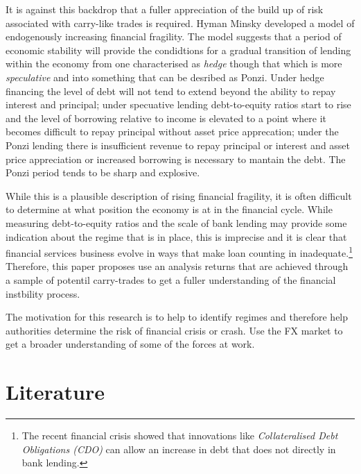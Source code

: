 \documentclass[12pt, a4paper, oneside]{article} %
\begin{document}
It is against this backdrop that a fuller appreciation of the build up of risk associated with carry-like trades is required. Hyman Minsky developed a model of endogenously increasing financial fragility.  The model suggests that a period of economic stability will provide the condidtions for a gradual transition of lending within the economy from one characterised as \emph{hedge} though that which is more \emph{speculative} and into something that can be desribed as {Ponzi}.  Under hedge financing the level of debt will not tend to extend beyond the ability to repay interest and principal; under specuative lending debt-to-equity ratios start to rise and the level of borrowing relative to income is elevated to a point where it becomes difficult to repay principal without asset price apprecation; under the Ponzi lending there is insufficient revenue to repay principal or interest and asset price appreciation or increased borrowing is necessary to mantain the debt. The Ponzi period tends to be sharp and explosive.

While this is a plausible description of rising financial fragility, it is often difficult to determine at what position the economy is at in the financial cycle.  While measuring debt-to-equity ratios and the scale of bank lending may provide some indication about the regime that is in place, this is imprecise and it is clear that financial services business evolve in ways that make loan counting in inadequate.\footnote{The recent financial crisis showed that innovations like \emph{Collateralised Debt Obligations (CDO)} can allow an increase in debt that does not directly in bank lending.}   Therefore, this paper proposes use an analysis returns that are achieved through a sample of potentil carry-trades to get a fuller understanding of the financial instbility process.  

The motivation for this research is to help to identify regimes and therefore help authorities determine the risk of financial crisis or crash. Use the FX market to get a broader understanding of some of the forces at work.

\section{Literature}
\end{document}
